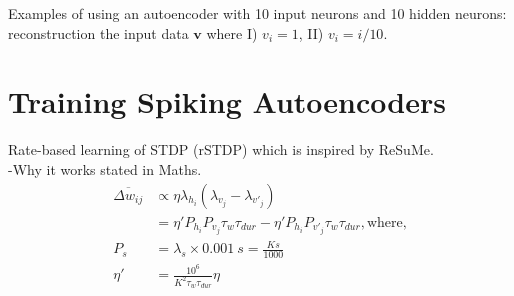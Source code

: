 	Examples of using an autoencoder with 10 input neurons and 10 hidden neurons: reconstruction the input data $\mathbf{v}$ where I) $v_i = 1$, II) $v_i = i/10$.
	
\section{Training Spiking Autoencoders}
Rate-based learning of STDP (rSTDP) which is inspired by ReSuMe.\\
-Why it works stated in Maths.\\
\begin{equation}
\begin{aligned}
\overline{\Delta w_{ij}} &\propto \eta \lambda_{h_i}(\lambda_{v_j} - \lambda_{v'_j})\\
&=\eta'P_{h_i}P_{v_j}\tau_{w} \tau_{dur} - \eta'P_{h_i}P_{v'_j}\tau_{w} \tau_{dur}, \textrm{where,}\\
P_{s} &= \lambda_{s} \times 0.001~s = \frac{K s}{1000}\\
\eta' &= \frac{10^6}{K^2 \tau_{w} \tau_{dur}} \eta
\end{aligned}
\end{equation}

